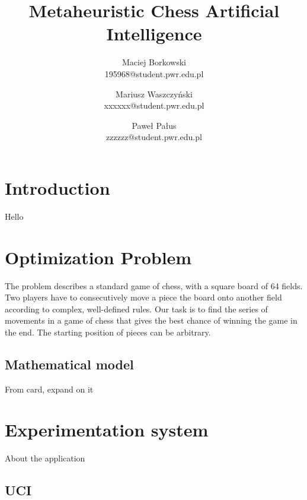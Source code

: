 \documentclass[pdftex]{article}
\date{}
\title{Metaheuristic Chess Artificial Intelligence}
\author{Maciej Borkowski\\ 195968@student.pwr.edu.pl  \and Mariusz Waszczyński\\  xxxxxx@student.pwr.edu.pl \and Paweł Pałus\\ zzzzzz@student.pwr.edu.pl}
\begin{document}
\thispagestyle{empty}

\section{Introduction}
\label{sec:introduction}

Hello

\section{Optimization Problem}
\label{sec:problem}

The problem describes a standard game of chess, with a square board of 64 fields. Two players have to consecutively move a piece the board onto another field according to complex, well-defined rules. Our task is to find the series of movements in a game of chess that gives the best chance of winning the game in the end. The starting position of pieces can be arbitrary.

\subsection{Mathematical model}
\label{sec:model}

From card, expand on it

\section{Experimentation system}
\label{sec:project}

About the application

\subsection{UCI}
\label{sec:uci}
\end{document}
